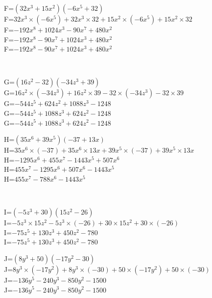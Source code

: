 \documentclass{article}%
\begin{document}
\begin{minipage}{0.5\textwidth}%
F=$(32x^3+15x^2)(-6x^5+32)$\\%
F=$32x^3 \times (-6x^5)+32x^3 \times 32+15x^2 \times (-6x^5)+15x^2 \times 32$\\%
F=$-192x^8+1024x^3-90x^7+480x^2$\\%
F=$-192x^8-90x^7+1024x^3+480x^2$\\%
F=$-192x^8-90x^7+1024x^3+480x^2$\\%
\end{minipage}%
\\%
\begin{minipage}{0.5\textwidth}%
G=$(16z^2-32)(-34z^3+39)$\\%
G=$16z^2 \times (-34z^3)+16z^2 \times 39-32 \times (-34z^3)-32 \times 39$\\%
G=$-544z^5+624z^2+1088z^3-1248$\\%
G=$-544z^5+1088z^3+624z^2-1248$\\%
G=$-544z^5+1088z^3+624z^2-1248$\\%
\end{minipage}%
\begin{minipage}{0.5\textwidth}%
H=$(35x^6+39x^5)(-37+13x)$\\%
H=$35x^6 \times (-37)+35x^6 \times 13x+39x^5 \times (-37)+39x^5 \times 13x$\\%
H=$-1295x^6+455x^7-1443x^5+507x^6$\\%
H=$455x^7-1295x^6+507x^6-1443x^5$\\%
H=$455x^7-788x^6-1443x^5$\\%
\end{minipage}%
\\%
\begin{minipage}{0.5\textwidth}%
I=$(-5z^3+30)(15z^2-26)$\\%
I=$-5z^3 \times 15z^2-5z^3 \times (-26)+30 \times 15z^2+30 \times (-26)$\\%
I=$-75z^5+130z^3+450z^2-780$\\%
I=$-75z^5+130z^3+450z^2-780$\\%
\end{minipage}%
\begin{minipage}{0.5\textwidth}%
J=$(8y^3+50)(-17y^2-30)$\\%
J=$8y^3 \times (-17y^2)+8y^3 \times (-30)+50 \times (-17y^2)+50 \times (-30)$\\%
J=$-136y^5-240y^3-850y^2-1500$\\%
J=$-136y^5-240y^3-850y^2-1500$\\%
\end{minipage}%
\end{document}
